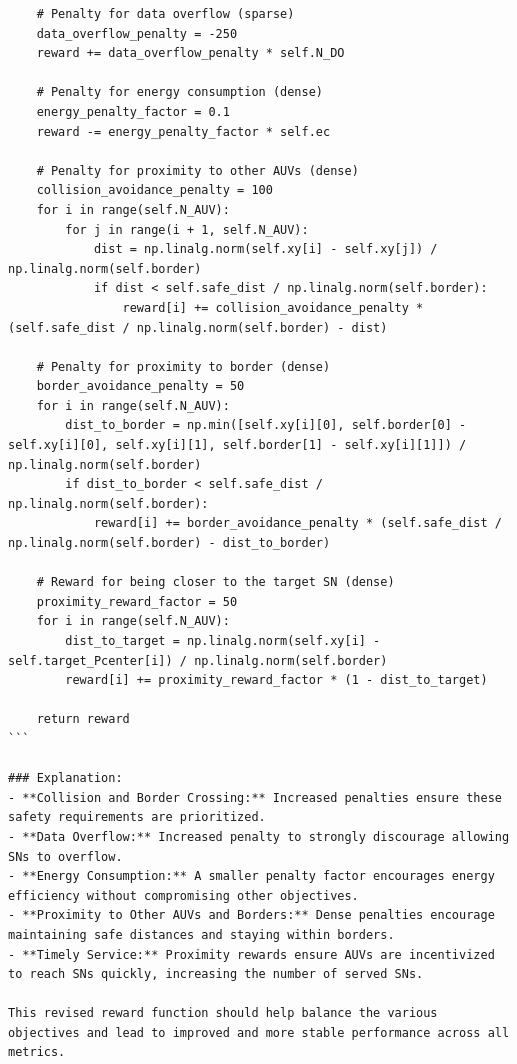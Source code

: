 \documentclass{article}
\begin{document}
\begin{verbatim}
    # Penalty for data overflow (sparse)
    data_overflow_penalty = -250
    reward += data_overflow_penalty * self.N_DO

    # Penalty for energy consumption (dense)
    energy_penalty_factor = 0.1
    reward -= energy_penalty_factor * self.ec

    # Penalty for proximity to other AUVs (dense)
    collision_avoidance_penalty = 100
    for i in range(self.N_AUV):
        for j in range(i + 1, self.N_AUV):
            dist = np.linalg.norm(self.xy[i] - self.xy[j]) / np.linalg.norm(self.border)
            if dist < self.safe_dist / np.linalg.norm(self.border):
                reward[i] += collision_avoidance_penalty * (self.safe_dist / np.linalg.norm(self.border) - dist)

    # Penalty for proximity to border (dense)
    border_avoidance_penalty = 50
    for i in range(self.N_AUV):
        dist_to_border = np.min([self.xy[i][0], self.border[0] - self.xy[i][0], self.xy[i][1], self.border[1] - self.xy[i][1]]) / np.linalg.norm(self.border)
        if dist_to_border < self.safe_dist / np.linalg.norm(self.border):
            reward[i] += border_avoidance_penalty * (self.safe_dist / np.linalg.norm(self.border) - dist_to_border)

    # Reward for being closer to the target SN (dense)
    proximity_reward_factor = 50
    for i in range(self.N_AUV):
        dist_to_target = np.linalg.norm(self.xy[i] - self.target_Pcenter[i]) / np.linalg.norm(self.border)
        reward[i] += proximity_reward_factor * (1 - dist_to_target)

    return reward
```

### Explanation:
- **Collision and Border Crossing:** Increased penalties ensure these safety requirements are prioritized.
- **Data Overflow:** Increased penalty to strongly discourage allowing SNs to overflow.
- **Energy Consumption:** A smaller penalty factor encourages energy efficiency without compromising other objectives.
- **Proximity to Other AUVs and Borders:** Dense penalties encourage maintaining safe distances and staying within borders.
- **Timely Service:** Proximity rewards ensure AUVs are incentivized to reach SNs quickly, increasing the number of served SNs.

This revised reward function should help balance the various objectives and lead to improved and more stable performance across all metrics.
\end{verbatim}
\end{document}

